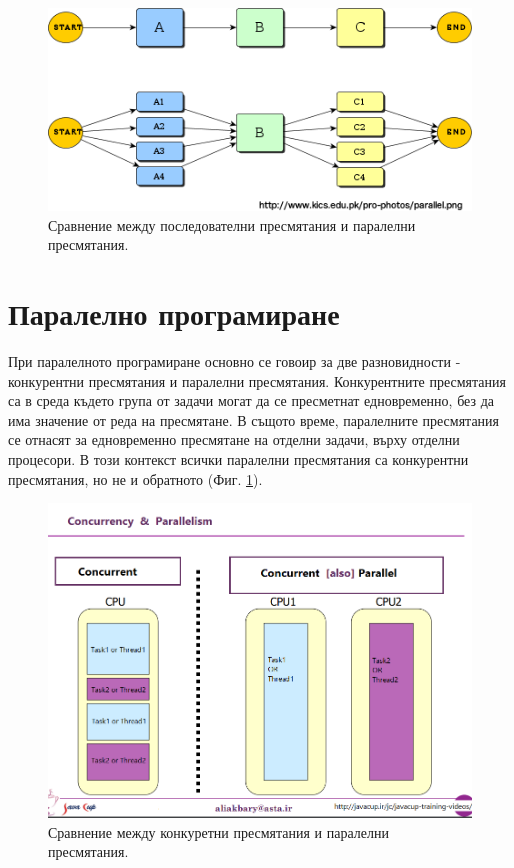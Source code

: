 \documentclass[book,14pt,oneside,openany]{memoir}
\begin{document}
\begin{figure}[h]
  \centering
  \includegraphics[width=1.0\linewidth]{./images/pic0001.png}
  \caption{Сравнение между последователни пресмятания и паралелни пресмятания.}
\label{fig:pic0001}
\end{figure}

\section{Паралелно програмиране}

При паралелното програмиране основно се говоир за две разновидности - конкурентни пресмятания и паралелни пресмятания. Конкурентните пресмятания са в среда където група от задачи могат да се пресметнат едновременно, без да има значение от реда на пресмятане. В същото време, паралелните пресмятания се отнасят за едновременно пресмятане на отделни задачи, върху отделни процесори. В този контекст всички паралелни пресмятания са конкурентни пресмятания, но не и обратното (Фиг. \ref{fig:pic0001}). 

\begin{figure}[h]
  \centering
  \includegraphics[width=1.0\linewidth]{./images/pic0002.png}
  \caption{Сравнение между конкуретни пресмятания и паралелни пресмятания.}
\label{fig:pic0002}
\end{figure}
\end{document}
